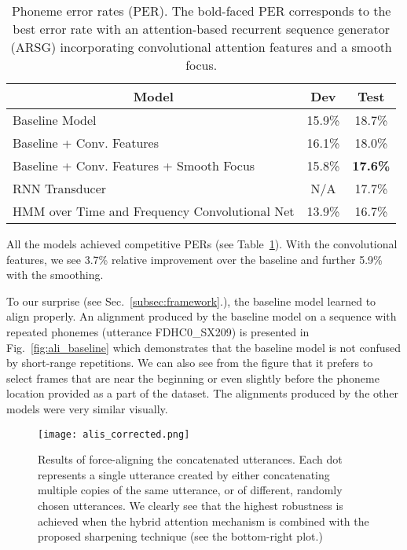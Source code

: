 \documentclass{article}
\begin{document}
\begin{table}[h]
    \caption{Phoneme error rates (PER). The bold-faced PER corresponds to the
    best error rate with an attention-based recurrent sequence generator (ARSG)
    incorporating convolutional attention features and a smooth focus. }
  \label{tab:results}
\centering
\begin{tabular}{l|c|c}
\multicolumn{1}{c|}{\bf Model}  &\multicolumn{1}{c|}{\bf Dev} &\multicolumn{1}{c}{\bf Test} \\ 
  \hline 
  \hline 
Baseline Model & 15.9\% & 18.7\% \\
Baseline + Conv. Features & 16.1\% & 18.0\% \\
  Baseline + Conv. Features + Smooth Focus & 15.8\% & {\bf 17.6\%} \\
  \hline
RNN Transducer 
  \cite{graves_2013_timit} & N/A & 17.7\% \\
  \hline\hline
  HMM over Time and Frequency Convolutional Net
  \cite{toth_2014} & 13.9\% & 16.7\% 
  \end{tabular}

  \vspace{-4mm}
\end{table}

All the models achieved competitive
PERs (see Table~\ref{tab:results}). 
With the convolutional features, we see 3.7\% relative improvement over the
baseline and further 5.9\% with the smoothing. 







To our surprise
(see Sec.~\ref{subsec:framework}.),  
the baseline model learned to align properly.
An alignment produced by the baseline model
on a sequence with repeated phonemes (utterance FDHC0\_SX209) is presented in
Fig.~\ref{fig:ali_baseline} which demonstrates that  the baseline model is not
confused by short-range repetitions. We can also see
from the figure that it
prefers to select frames that are near the beginning or even slightly before the
phoneme location provided as a part of the dataset. The alignments produced by
the other models were very similar visually.

\begin{figure}[t]
  \centering
  \vspace{.1cm} \texttt{[image: alis\_corrected.png]}
\caption[Results of force-aligning of long utterances with corrections.]{
    Results of force-aligning the concatenated utterances. Each dot
    represents a single utterance created by either concatenating
    multiple copies of the same utterance, or of different, randomly
    chosen utterances. 
We clearly see that the highest robustness is achieved
    when the hybrid attention mechanism is combined with the proposed sharpening
    technique (see the bottom-right plot.)
}
  \label{fig:forced_ali_corrected}

  \vspace{-4mm}
\end{figure}
\end{document}
